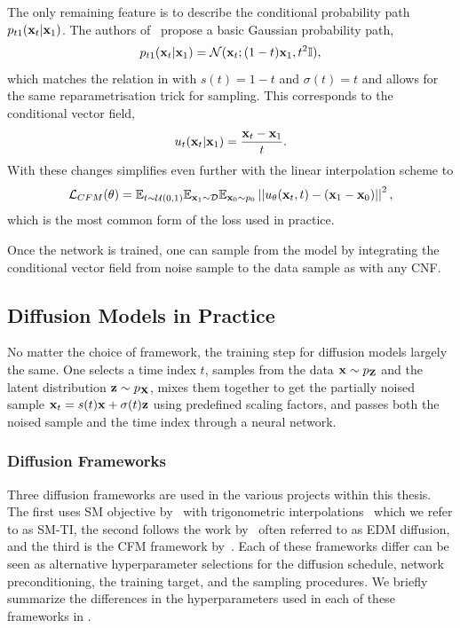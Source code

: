 The only remaining feature is to describe the conditional probability path $p_{t1}(\mathbf{x}_t | \mathbf{x}_1)$.
The authors of~\cite{FlowStraightFast} propose a basic Gaussian probability path,
\begin{equation}
    \label{eq:conditional_gaussian}
    p_{t1}(\mathbf{x}_t | \mathbf{x}_1) = \mathcal{N}(\mathbf{x}_t; (1 - t)\mathbf{x}_1, t^2\mathbb{I}),
\end{equation}
which matches the relation in  with $s(t) = 1 - t$ and $\sigma(t) = t$ and allows for the same reparametrisation trick for sampling.
This corresponds to the conditional vector field,
\begin{equation}
    \label{eq:conditional_gaussian_field}
    u_t(\mathbf{x}_t | \mathbf{x}_1) = \frac{\mathbf{x}_t-\mathbf{x}_1}{t}.
\end{equation}
With these changes  simplifies even further with the linear interpolation scheme to
\begin{equation}
    \label{eq:linear_cfm_loss}
    \mathcal{L}_{CFM}(\theta) =
    \mathbb{E}_{t \sim \mathcal{U}(0, 1)}
    \mathbb{E}_{\mathbf{x}_1 \sim \mathcal{D}}
    \mathbb{E}_{\mathbf{x}_0 \sim p_0}
    \left|\left|u_\theta(\mathbf{x}_t, t) - (\mathbf{x}_1 - \mathbf{x}_0)\right|\right|^2,
\end{equation}
which is the most common form of the loss used in practice.

Once the network is trained, one can sample from the model by integrating the conditional vector field from noise sample to the data sample as with any CNF.

\subsection{Diffusion Models in Practice}

No matter the choice of framework, the training step for diffusion models largely the same.
One selects a time index $t$, samples from the data $\mathbf{x} \sim p_{\mathbf{Z}}$ and the latent distribution $\mathbf{z} \sim p_{\mathbf{X}}$, mixes them together to get the partially noised sample $\mathbf{x}_t = s(t)\mathbf{x} + \sigma(t)\mathbf{z}$ using predefined scaling factors, and passes both the noised sample and the time index through a neural network.

\subsubsection{Diffusion Frameworks}

Three diffusion frameworks are used in the various projects within this thesis.
The first uses SM objective by~\textcite{GenerativeModelingEstimating} with  trigonometric interpolations~\cite{StochasticInterpolants, ImprovedDenoisingDiffusion} which we refer to as SM-TI, the second follows the work by~\textcite{ElucidatingDesignSpace} often referred to as EDM diffusion, and the third is the CFM framework by~\textcite{FlowMatchingGenerative,FlowStraightFast,BuildingNormalizingFlows}.
Each of these frameworks differ can be seen as alternative hyperparameter selections for the diffusion schedule, network preconditioning, the training target, and the sampling procedures.
We briefly summarize the differences in the hyperparameters used in each of these frameworks in .

